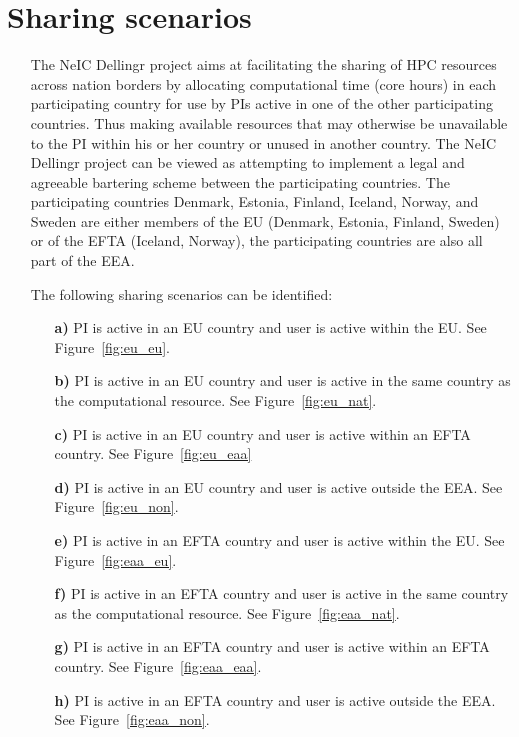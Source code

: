 \documentclass{article}
\newcommand{\dell}{Dellingr\xspace}
\begin{document}
\section{Sharing scenarios}\label{sec:usecase}
\begin{itemize}
    \item []
The NeIC \dell project aims at facilitating the sharing of HPC resources across nation borders by allocating computational time (core hours) in each participating country for use by PIs active in one of the other participating countries. 
Thus making available resources that may otherwise be unavailable to the PI within his or her country or unused in another country.
The NeIC \dell project can be viewed as 
attempting to implement a legal and agreeable %
bartering scheme between the participating countries. 
The participating countries Denmark, Estonia, Finland, Iceland, Norway, and Sweden are either members of the EU (Denmark, Estonia, Finland, Sweden) or of the EFTA (Iceland, Norway), the participating countries are also all part of the EEA. 

The following sharing scenarios can be identified:
\begin{itemize}
    \item[\textbf{a)}] PI is active in an EU country and user is active within the EU. See Figure~\ref{fig:eu_eu}.
    \item[\textbf{b)}] PI is active in an EU country and user is active in the same country as the computational resource. See Figure~\ref{fig:eu_nat}.
    \item[\textbf{c)}] PI is active in an EU country and user is active within an EFTA country. See Figure~\ref{fig:eu_eaa}
    \item[\textbf{d)}] PI is active in an EU country and user is active outside the EEA. See Figure~\ref{fig:eu_non}.
    \item[\textbf{e)}] PI is active in an EFTA country and user is active within the EU. See Figure~\ref{fig:eaa_eu}.
    \item[\textbf{f)}] PI is active in an EFTA country and user is active in the same country as the computational resource. See Figure~\ref{fig:eaa_nat}.
    \item[\textbf{g)}] PI is active in an EFTA country and user is active within an EFTA country. See Figure~\ref{fig:eaa_eaa}.
    \item[\textbf{h)}] PI is active in an EFTA country and user is active outside the EEA. See Figure~\ref{fig:eaa_non}.
\end{itemize}
\end{itemize}
\end{document}
